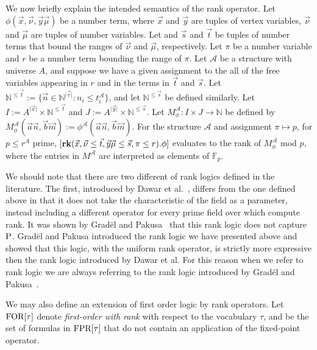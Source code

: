 \documentclass[../paper.tex]{subfiles}
\begin{document}
We now briefly explain the intended semantics of the rank operator. Let $\phi
(\vec{x}, \vec {\nu}, \vec{y}\vec{\mu})$ be a number term, where $\vec{x}$ and
$\vec{y}$ are tuples of vertex variables, $\vec{\nu}$ and $\vec{\mu}$ are tuples
of number variables. Let and $\vec{s}$ and $\vec{t}$ be tuples of number terms
that bound the ranges of $\vec{\nu}$ and $\vec{\mu}$, respectively. Let $\pi$ be
a number variable and $r$ be a number term bounding the range of $\pi$. Let
$\mathcal{A}$ be a structure with universe $A$, and suppose we have a given
assignment to the all of the free variables appearing in $r$ and in the terms in
$\vec{t}$ and $\vec{s}$. Let $\mathbb{N}^{\leq\vec{t}} := \{\vec{n} \in
\mathbb{N}^{\vert \vec{v} \vert}: n_i \leq t^{\mathcal{A}}_i\}$, and let
$\mathbb{N}^{\leq \vec{s}}$ be defined similarly. Let $I:= A^{\vert \vec{x}
  \vert} \times \mathbb{N}^{\leq \vec{t}}$ and $J := A^{\vert \vec{y} \vert}
\times \mathbb{N}^{\leq \vec{s}}$. Let $M^{\mathcal{A}}_\phi : I \times J
\rightarrow \mathbb{N}$ be defined by $M^{\mathcal{A}}_\phi (\vec{a}\vec{n},
\vec{b}\vec{m}):= \phi^{\mathcal{A}}(\vec{a}\vec{n},\vec{b}\vec{m})$. For the
structure $\mathcal{A}$ and assignment $\pi \mapsto p$, for $p \leq r^{A}$
prime, $[\text{\textbf{rk}} (\vec{x}, \vec {\nu} \leq \vec{t}, \vec{y}\vec{\mu} \leq \vec{s},
\pi \leq r). \phi]$ evaluates to the rank of $M^{\mathcal{A}}_\phi$ mod $p$,
where the entries in $M^{\mathcal{A}}$ are interpreted as elements of
$\mathbb{F}_p$.

We should note that there are two different of rank logics defined in the
literature. The first, introduced by Dawar et al.~\cite{Dawar09logicswith},
differs from the one defined above in that it does not take the characteristic
of the field as a parameter, instead including a different operator for every
prime field over which compute rank. It was shown by Grad{\"e}l and
Pakusa~\cite{GradelP15a} that this rank logic does not capture $\mathrm{P}$. Grad{\"e}l
and Pakusa introduced the rank logic we have presented above and showed that
this logic, with the uniform rank operator, is strictly more expressive then the
rank logic introduced by Dawar et al. For this reason when we refer to rank
logic we are always referring to the rank logic introduced by Grad{\"e}l and
Pakusa~\cite{GradelP15a}.

We may also define an extension of first order logic by rank operators. Let
$\text{\upshape FOR}[\tau]$ denote \emph{first-order with rank} with respect to the vocabulary
$\tau$, and be the set of formulas in $\text{\upshape FPR}[\tau]$ that do not contain an
application of the fixed-point operator.
\end{document}
